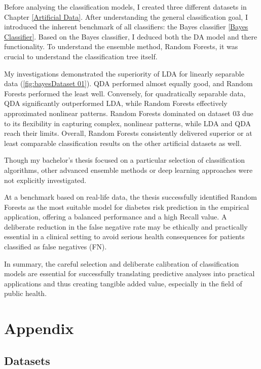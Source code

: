 \documentclass[12pt,a4paper,titlepage]{article}
\numberwithin{equation}{section}
\numberwithin{table}{section}
\numberwithin{figure}{section}
\begin{document}
Before analysing the classification models, I created three different datasets in Chapter \ref{Artificial Data}. After understanding the general classification goal, I introduced the inherent benchmark of all classifiers: the Bayes classifier \ref{Bayes Classifier}. Based on the Bayes classifier, I deduced both the DA model and there functionality. To understand the ensemble method, Random Forests, it was crucial to understand the classification tree itself.

My investigations demonstrated the superiority of LDA for linearly separable data (\ref{fig:bayesDataset 01}). QDA performed almost equally good, and Random Forests performed the least well. Conversely, for quadratically separable data, QDA significantly outperformed LDA, while Random Forests effectively approximated nonlinear patterns. Random Forests dominated on dataset 03 due to its flexibility in capturing complex, nonlinear patterns, while LDA and QDA reach their limits. Overall, Random Forests consistently delivered superior or at least comparable classification results on the other artificial datasets as well.

\noindent Though my bachelor's thesis focused on a particular selection of classification algorithms, other advanced ensemble methods or deep learning approaches were not explicitly investigated.

\noindent At a benchmark based on real-life data, the thesis successfully identified Random Forests as the most suitable model for diabetes risk prediction in the empirical application, offering a balanced performance and a high Recall value. A deliberate reduction in the false negative rate may be ethically and practically essential in a clinical setting to avoid serious health consequences for patients classified as false negatives (FN).

In summary, the careful selection and deliberate calibration of classification models are essential for successfully translating predictive analyses into practical applications and thus creating tangible added value, especially in the field of public health.

\printbibliography[heading=bibintoc]
\newpage
{}

\appendix
\section{Appendix}
    \subsection{Datasets}
\end{document}
